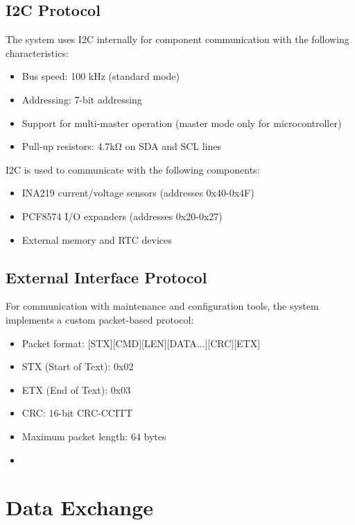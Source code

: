 \documentclass[12pt,a4paper,twoside,openright]{book}
\begin{document}
\subsection{I2C Protocol}

The system uses I2C internally for component communication with the following characteristics:

\begin{itemize}
    \item Bus speed: 100 kHz (standard mode)
    \item Addressing: 7-bit addressing 
    \item Support for multi-master operation (master mode only for microcontroller)
    \item Pull-up resistors: 4.7kΩ on SDA and SCL lines
\end{itemize}

I2C is used to communicate with the following components:
\begin{itemize}
    \item INA219 current/voltage sensors (addresses 0x40-0x4F)
    \item PCF8574 I/O expanders (addresses 0x20-0x27)
    \item External memory and RTC devices
\end{itemize}

\subsection{External Interface Protocol}

For communication with maintenance and configuration tools, the system implements a custom packet-based protocol:

\begin{itemize}
    \item Packet format: [STX][CMD][LEN][DATA...][CRC][ETX]
    \item STX (Start of Text): 0x02
    \item ETX (End of Text): 0x03
    \item CRC: 16-bit CRC-CCITT
    \item Maximum packet length: 64 bytes
    \item [Need drawing of: packet structure diagram showing byte positions and field descriptions]
\end{itemize}

\section{Data Exchange}
\end{document}
